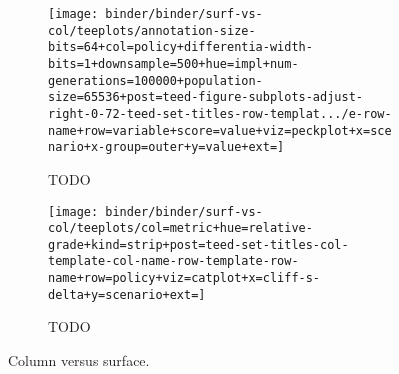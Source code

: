 \begin{figure*}
  \centering
  \begin{subfigure}[b]{0.5\textwidth}
    \centering
    \texttt{[image: binder/binder/surf-vs-col/teeplots/annotation-size-bits=64+col=policy+differentia-width-bits=1+downsample=500+hue=impl+num-generations=100000+population-size=65536+post=teed-figure-subplots-adjust-right-0-72-teed-set-titles-row-templat.../e-row-name+row=variable+score=value+viz=peckplot+x=scenario+x-group=outer+y=value+ext=]}
    \caption{TODO}
  \end{subfigure}%
  \begin{subfigure}[b]{0.5\textwidth}
    \centering
    \texttt{[image: binder/binder/surf-vs-col/teeplots/col=metric+hue=relative-grade+kind=strip+post=teed-set-titles-col-template-col-name-row-template-row-name+row=policy+viz=catplot+x=cliff-s-delta+y=scenario+ext=]}
    \caption{TODO}
  \end{subfigure}
  \caption{Column versus surface.}
  \label{fig:col-vs-surf-summary}
\end{figure*}
